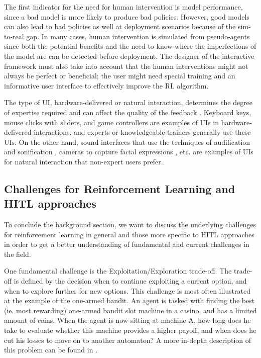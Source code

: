 \documentclass[twoside,11pt]{article}
\begin{document}
The first indicator for the need for human intervention is model performance, since a bad model is more likely to produce bad policies. However, good models can also lead to bad policies as well at deployment scenarios because of the sim-to-real gap. In many cases, human intervention is simulated from pseudo-agents since both the potential benefits and the need to know where the imperfections of the model are can be detected before deployment. The designer of the interactive framework must also take into account that the human interventions might not always be perfect or beneficial; the user might need special training and an informative user interface to effectively improve the RL algorithm. 

The type of UI, hardware-delivered or natural interaction,  determines the degree of expertise required and can affect the quality of the feedback \citep{lin:20}. Keyboard keys, mouse clicks with sliders, and game controllers are examples of UIs in hardware-delivered interactions, and experts or knowledgeable trainers generally use these UIs. On the other hand, sound interfaces that use the techniques of audification and sonification \citep{Hermann:2011:Sonification,kartoun:10, Saranti:2009,Scurto:2021:DesigningDeepRLHumanParameterExploration}, cameras to capture facial expressions \citep{arakawa:18}, etc. are examples of UIs for natural interaction that non-expert users prefer. 

\subsection{Challenges for Reinforcement Learning and HITL approaches} 
\label{sec:ChallengesRL}

To conclude the background section, we want to discuss the underlying challenges for reinforcement learning in general and those more specific to HITL approaches in order to get a better understanding of fundamental and current challenges in the field.

One fundamental challenge is the Exploitation/Exploration trade-off. The trade-off is defined by the decision when to continue exploiting a current option, and when to explore further for new options. This challenge is most often illustrated at the example of the one-armed bandit. An agent is tasked with finding the best (ie. most rewarding) one-armed bandit slot machine in a casino, and has a limited amount of coins. When the agent is now sitting at machine A, how long does he take to evaluate whether this machine provides a higher payoff, and when does he cut his losses to move on to another automaton? A more in-depth description of this problem can be found in \citet{AudibertMunosSzepesv:2009:ExplorationExploitation}.
\end{document}
